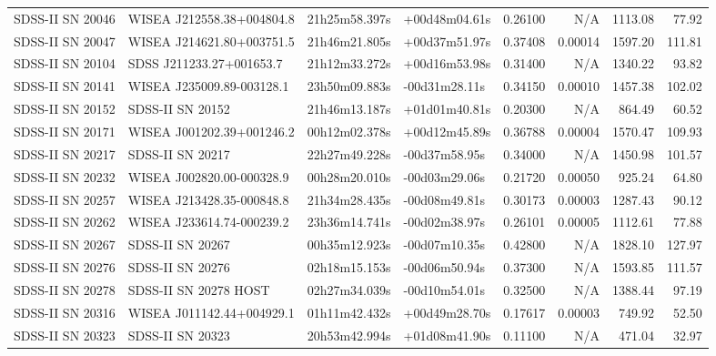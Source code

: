 \begin{longtable}{llllrrrr}
SDSS-II SN 20046 &       WISEA J212558.38+004804.8 &   21h25m58.397s &   +00d48m04.61s &  0.26100 &      N/A &  1113.08 &       77.92 \\
SDSS-II SN 20047 &       WISEA J214621.80+003751.5 &   21h46m21.805s &   +00d37m51.97s &  0.37408 &  0.00014 &  1597.20 &      111.81 \\
SDSS-II SN 20104 &        SDSS J211233.27+001653.7 &   21h12m33.272s &   +00d16m53.98s &  0.31400 &      N/A &  1340.22 &       93.82 \\
SDSS-II SN 20141 &       WISEA J235009.89-003128.1 &   23h50m09.883s &   -00d31m28.11s &  0.34150 &  0.00010 &  1457.38 &      102.02 \\
SDSS-II SN 20152 &                SDSS-II SN 20152 &   21h46m13.187s &   +01d01m40.81s &  0.20300 &      N/A &   864.49 &       60.52 \\
SDSS-II SN 20171 &       WISEA J001202.39+001246.2 &   00h12m02.378s &   +00d12m45.89s &  0.36788 &  0.00004 &  1570.47 &      109.93 \\
SDSS-II SN 20217 &                SDSS-II SN 20217 &   22h27m49.228s &   -00d37m58.95s &  0.34000 &      N/A &  1450.98 &      101.57 \\
SDSS-II SN 20232 &       WISEA J002820.00-000328.9 &   00h28m20.010s &   -00d03m29.06s &  0.21720 &  0.00050 &   925.24 &       64.80 \\
SDSS-II SN 20257 &       WISEA J213428.35-000848.8 &   21h34m28.435s &   -00d08m49.81s &  0.30173 &  0.00003 &  1287.43 &       90.12 \\
SDSS-II SN 20262 &       WISEA J233614.74-000239.2 &   23h36m14.741s &   -00d02m38.97s &  0.26101 &  0.00005 &  1112.61 &       77.88 \\
SDSS-II SN 20267 &                SDSS-II SN 20267 &   00h35m12.923s &   -00d07m10.35s &  0.42800 &      N/A &  1828.10 &      127.97 \\
SDSS-II SN 20276 &                SDSS-II SN 20276 &   02h18m15.153s &   -00d06m50.94s &  0.37300 &      N/A &  1593.85 &      111.57 \\
SDSS-II SN 20278 &           SDSS-II SN 20278 HOST &   02h27m34.039s &   -00d10m54.01s &  0.32500 &      N/A &  1388.44 &       97.19 \\
SDSS-II SN 20316 &       WISEA J011142.44+004929.1 &   01h11m42.432s &   +00d49m28.70s &  0.17617 &  0.00003 &   749.92 &       52.50 \\
SDSS-II SN 20323 &                SDSS-II SN 20323 &   20h53m42.994s &   +01d08m41.90s &  0.11100 &      N/A &   471.04 &       32.97 \\

\end{longtable}
